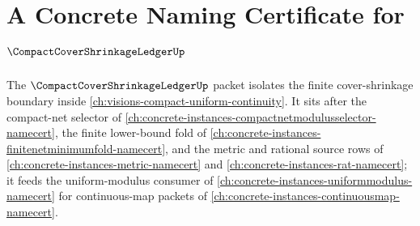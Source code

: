 \chapter{A Concrete Naming Certificate for $\CompactCoverShrinkageLedgerUp$}
\label{ch:concrete-instances-compact-cover-shrinkage-ledger-namecert}

The $\CompactCoverShrinkageLedgerUp$ packet isolates the finite cover-shrinkage boundary inside \autoref{ch:visions-compact-uniform-continuity}. It sits after the compact-net selector of \autoref{ch:concrete-instances-compactnetmodulusselector-namecert}, the finite lower-bound fold of \autoref{ch:concrete-instances-finitenetminimumfold-namecert}, and the metric and rational source rows of \autoref{ch:concrete-instances-metric-namecert} and \autoref{ch:concrete-instances-rat-namecert}; it feeds the uniform-modulus consumer of \autoref{ch:concrete-instances-uniformmodulus-namecert} for continuous-map packets of \autoref{ch:concrete-instances-continuousmap-namecert}.

